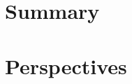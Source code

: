 \documentclass[10pt, a4paper, twoside, openright]{report}
\newcommand{\q}[1]{``#1''} %
\newcommand{\klimo}{doc. Ing. Ondřej Klimo, Ph.D.}
\newcommand{\bulanov}{Prof. Sergei Vladimirovich Bulanov}
\begin{document}
\section{Summary}

\section{Perspectives}










\end{document}
